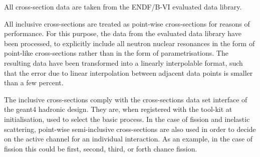 All cross-section data are taken from the ENDF/B-VI\cite{ENDF} 
evaluated data library. 

All inclusive cross-sections
are treated as point-wise cross-sections for reasons of performance. 
For this purpose, the data from the evaluated data library have been processed, 
to explicitly include all neutron nuclear resonances in the form of
point-like cross-sections rather than in the form of parametrisations.
The resulting data have been transformed into a linearly interpolable format, 
such that the error due to linear interpolation between adjacent data points 
is smaller than a few percent.

The inclusive cross-sections comply with the cross-sections data set interface 
of the geant4 hadronic design.
They are, when registered with the tool-kit at initialisation, used 
to select the basic process. 
In the case of fission and inelastic scattering, point-wise
semi-inclusive cross-sections are also used in order to decide on the active 
channel
for an individual interaction. As an example, in the case of fission 
this could be first, second, third, or forth chance fission.

